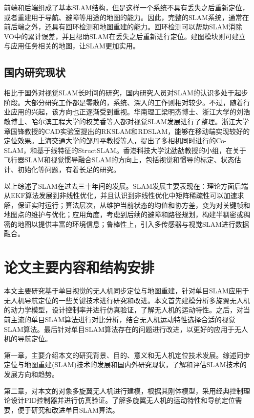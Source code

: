 前端和后端组成了基本SLAM结构，但是这样一个系统不具有丢失之后重新定位，或者重建用于导航、避障等用途的地图的能力。因此，完整的SLAM系统，通常在前后端之外，还具有回环检测和地图重建的能力。回环检测可以帮助SLAM消除VO中的累计误差，并且帮助SLAM在丢失之后重新进行定位\upcite{[1.40]}。建图模块则可建立与应用任务相关的地图，让SLAM更加实用\upcite{[1.41]}。


\subsection{国内研究现状}
相比于国外对视觉SLAM长时间的研究，国内研究人员对SLAM的认识多处于起步阶段。大部分研究工作都是零散的，系统、深入的工作则相对较少。不过，随着行业应用的兴起，该方向也正逐渐受到重视。华南理工梁明杰博士\upcite{[1.42]}、浙江大学的刘浩敏博士\upcite{[1.43]}、哈尔滨工程大学的权美香\upcite{[1.44]}等人都对视觉SLAM发展进行了整理。浙江大学章国锋教授的CAD实验室提出的RKSLAM\upcite{[1.45]}和RDSLAM\upcite{[1.46]}，能够在移动端实现较好的定位效果。上海交通大学的邹丹平教授等人，提出了多相机同时进行的Co-SLAM\upcite{[1.47]}，和基于线特征的StructSLAM\upcite{[1.48]}。香港科技大学沈劭劼教授\upcite{[1.49]}的小组，在关于飞行器SLAM和视觉惯导融合SLAM的方向上，包括视觉和惯导的标定、状态估计、初始化等问题，有着长足的研究。


以上综述了SLAM在过去三十年间的发展。SLAM发展主要表现在：理论方面后端从EKF算法发展到非线性优化，并且认识到非线性优化中矩阵稀疏性可以加速求解，保证实时运行；算法层次，从维护当前状态的均值和协方差，变为对关键帧和地图点的维护与优化；应用角度，考虑到后续的避障和路径规划，构建半稠密或稠密的地图以提供丰富的环境信息；鲁棒性上，引入多传感器与视觉SLAM进行数据融合。

\section{论文主要内容和结构安排}
本文主要研究基于单目视觉的无人机同步定位与地图重建，针对单目SLAM应用于无人机导航定位的一些关键技术进行研究和改进。本文首先建模分析多旋翼无人机的动力学模型，设计控制率并进行仿真验证，了解无人机的运动特性。之后，对当前主流的单目SLAM算法进行对比分析，结合无人机运动特性选择合适的视觉SLAM算法。最后针对单目SLAM算法存在的问题进行改进，以更好的应用于无人机的导航定位。

第一章，主要介绍本文的研究背景、目的、意义和无人机定位技术发展。综述同步定位与地图重建(SLAM)技术的发展和国内外研究现状，了解和评估SLAM技术的发展方向和趋势。

第二章，对本文的对象多旋翼无人机进行建模，根据其刚体模型，采用经典控制理论设计PID控制器并进行仿真验证。了解多旋翼无人机的运动特性和导航定位需要，便于研究和改进单目SLAM算法。

